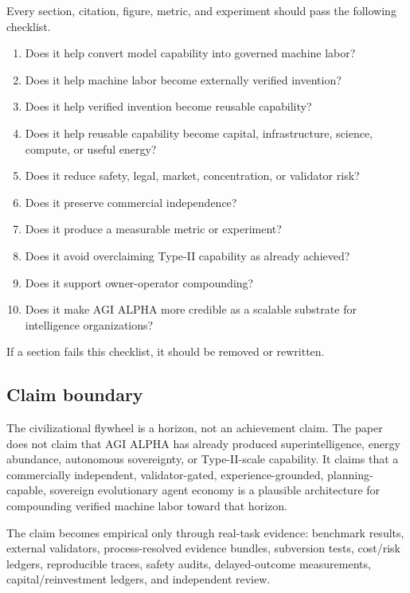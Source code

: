 \documentclass[
  11pt,
]{article}
\providecommand{\tightlist}{%
  \setlength{\itemsep}{0pt}\setlength{\parskip}{0pt}}
\begin{document}
Every section, citation, figure, metric, and experiment should pass the
following checklist.

\begin{enumerate}
\def\labelenumi{\arabic{enumi}.}
\tightlist
\item
  Does it help convert model capability into governed machine labor?
\item
  Does it help machine labor become externally verified invention?
\item
  Does it help verified invention become reusable capability?
\item
  Does it help reusable capability become capital, infrastructure,
  science, compute, or useful energy?
\item
  Does it reduce safety, legal, market, concentration, or validator
  risk?
\item
  Does it preserve commercial independence?
\item
  Does it produce a measurable metric or experiment?
\item
  Does it avoid overclaiming Type-II capability as already achieved?
\item
  Does it support owner-operator compounding?
\item
  Does it make AGI ALPHA more credible as a scalable substrate for
  intelligence organizations?
\end{enumerate}

If a section fails this checklist, it should be removed or rewritten.

\subsection{Claim boundary}\label{claim-boundary}

The civilizational flywheel is a horizon, not an achievement claim. The
paper does not claim that AGI ALPHA has already produced
superintelligence, energy abundance, autonomous sovereignty, or
Type-II-scale capability. It claims that a commercially independent,
validator-gated, experience-grounded, planning-capable, sovereign
evolutionary agent economy is a plausible architecture for compounding
verified machine labor toward that horizon.

The claim becomes empirical only through real-task evidence: benchmark
results, external validators, process-resolved evidence bundles,
subversion tests, cost/risk ledgers, reproducible traces, safety audits,
delayed-outcome measurements, capital/reinvestment ledgers, and
independent review.
\end{document}
